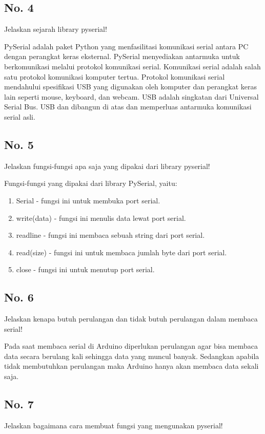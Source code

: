 \subsection{No. 4}
	Jelaskan sejarah library pyserial!

	\hfill \break
	PySerial adalah paket Python yang menfasilitasi komunikasi serial antara PC dengan perangkat keras eksternal. PySerial menyediakan antarmuka untuk berkomunikasi melalui protokol komunikasi serial. Komunikasi serial adalah salah satu protokol komunikasi komputer tertua. Protokol komunikasi serial mendahului spesifikasi USB yang digunakan oleh komputer dan perangkat keras lain seperti mouse, keyboard, dan webcam. USB adalah singkatan dari Universal Serial Bus. USB dan dibangun di atas dan memperluas antarmuka komunikasi serial asli.

\subsection{No. 5}
	Jelaskan fungsi-fungsi apa saja yang dipakai dari library pyserial!

	\hfill \break
	Fungsi-fungsi yang dipakai dari library PySerial, yaitu:
	\begin{enumerate}
		\item Serial - fungsi ini untuk membuka port serial.
		\item write(data) - fungsi ini menulis data lewat port serial.
		\item readline - fungsi ini membaca sebuah string dari port serial.
		\item read(size) - fungsi ini untuk membaca jumlah byte dari port serial.
		\item close - fungsi ini untuk menutup port serial.
	\end{enumerate}

\subsection{No. 6}
	Jelaskan kenapa butuh perulangan dan tidak butuh perulangan dalam membaca serial!

	\hfill \break
	Pada saat membaca serial di Arduino diperlukan perulangan agar bisa membaca data secara berulang kali sehingga data yang muncul banyak. Sedangkan apabila tidak membutuhkan perulangan maka Arduino hanya akan membaca data sekali saja.

\subsection{No. 7}
	Jelaskan bagaimana cara membuat fungsi yang mengunakan pyserial!

